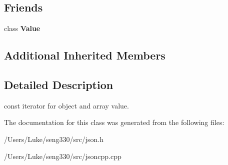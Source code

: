 \subsection*{Friends}
\begin{DoxyCompactItemize}
\item 
\hypertarget{class_json_1_1_value_const_iterator_aeceedf6e1a7d48a588516ce2b1983d6f}{}class {\bfseries Value}\label{class_json_1_1_value_const_iterator_aeceedf6e1a7d48a588516ce2b1983d6f}

\end{DoxyCompactItemize}
\subsection*{Additional Inherited Members}


\subsection{Detailed Description}
const iterator for object and array value. 



The documentation for this class was generated from the following files\+:\begin{DoxyCompactItemize}
\item 
/\+Users/\+Luke/seng330/src/json.\+h\item 
/\+Users/\+Luke/seng330/src/jsoncpp.\+cpp\end{DoxyCompactItemize}
